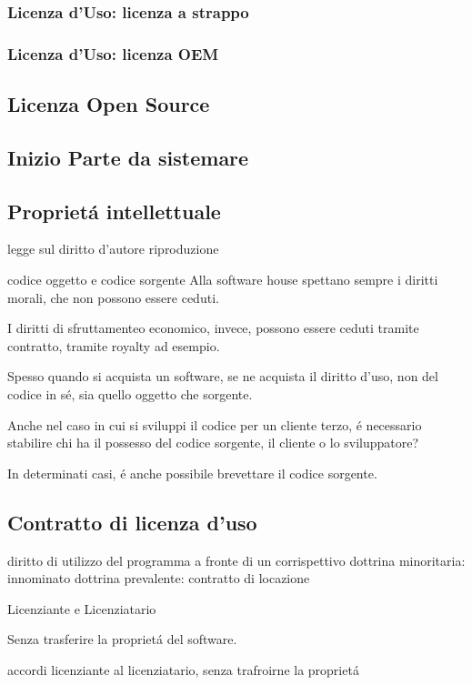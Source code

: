\documentclass{article}
\begin{document}
\subsubsection{Licenza d'Uso: licenza a strappo}
\subsubsection{Licenza d'Uso: licenza OEM}

\subsection{Licenza Open Source}

\subsection{Inizio Parte da sistemare}


\subsection{Propriet\'a intellettuale}
legge sul diritto d'autore
riproduzione

codice oggetto e codice sorgente
Alla software house spettano sempre i diritti morali, che non possono essere ceduti.

I diritti di sfruttamenteo economico, invece, possono essere ceduti tramite contratto, tramite royalty ad esempio.

Spesso quando si acquista un software, se ne acquista il diritto d'uso, non del codice in s\'e, sia quello oggetto che sorgente.

Anche nel caso in cui si sviluppi il codice per un cliente terzo, \'e necessario stabilire chi ha il possesso del codice sorgente, il cliente o lo sviluppatore?

In determinati casi, \'e anche possibile brevettare il codice sorgente.

\subsection{Contratto di licenza d'uso}
diritto di utilizzo del programma a fronte di un corrispettivo
dottrina minoritaria: innominato
dottrina prevalente: contratto di locazione

Licenziante e Licenziatario

Senza trasferire la propriet\'a del software.

accordi licenziante al licenziatario, senza trafroirne la propriet\'a
\end{document}
